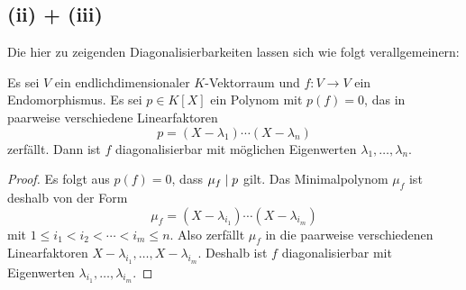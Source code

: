 \subsection*{(ii) + (iii)}

Die hier zu zeigenden Diagonalisierbarkeiten lassen sich wie folgt verallgemeinern:

\begin{lemma}
  \label{lemma: diagonalizable via polynomials}
  Es sei $V$ ein endlichdimensionaler $K$-Vektorraum und $f \colon V \to V$ ein Endomorphismus.
  Es sei $p \in K[X]$ ein Polynom mit $p(f) = 0$, das in paarweise verschiedene Linearfaktoren
  \[
    p = (X - \lambda_1) \dotsm (X - \lambda_n)
  \]
  zerfällt.
  Dann ist $f$ diagonalisierbar mit möglichen Eigenwerten $\lambda_1, \dotsc, \lambda_n$.
\end{lemma}

\begin{proof}
  Es folgt aus $p(f) = 0$, dass $\mu_f \mathrel{|} p$ gilt.
  Das Minimalpolynom $\mu_f$ ist deshalb von der Form
  \[
      \mu_f
    = (X - \lambda_{i_1}) \dotsm (X - \lambda_{i_m})
  \]
  mit $1 \leq i_1 < i_2 < \dotsb < i_m \leq n$.
  Also zerfällt $\mu_f$ in die paarweise verschiedenen Linearfaktoren $X - \lambda_{i_1}, \dotsc, X - \lambda_{i_m}$.
  Deshalb ist $f$ diagonalisierbar mit Eigenwerten $\lambda_{i_1}, \dotsc, \lambda_{i_m}$.
\end{proof}

